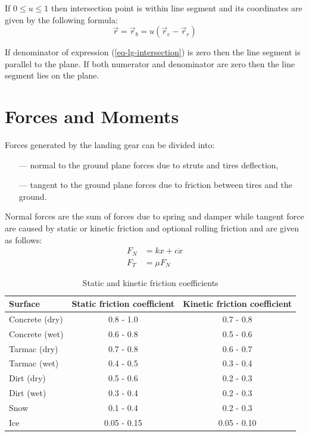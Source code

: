 If $0 \leq u \leq 1$ then intersection point is within line segment and its coordinates are given by the following formula:
\begin{equation}
  \vec r = {\vec r}_b = u \left( {\vec r}_e - {\vec r}_r \right)
\end{equation}

If denominator of expression (\ref{eq-lg-intersection}) is zero then the line segment is parallel to the plane. If both numerator and denominator are zero then the line segment lies on the plane.

\section{Forces and Moments}

Forces generated by the landing gear can be divided into:
\begin{itemize}
  \item[---] normal to the ground plane forces due to struts and tires deflection,
  \item[---] tangent to the ground plane forces due to friction between tires and the ground.
\end{itemize}

Normal forces are the sum of forces due to spring and damper while tangent force are caused by static or kinetic friction and optional rolling friction and are given as follows: \cite{ResnickHalliday2011}
\begin{align}
  F_N &= kx + c \dot x \\
  F_T &= \mu F_N
\end{align}

\begin{table}[h!]
  \begin{center}
    \begin{tabular}{ l | c | c }
      \toprule
      \textbf{Surface} & \textbf{Static friction coefficient} & \textbf{Kinetic friction coefficient} \\ \midrule
      Concrete (dry) &  0.8 - 1.0  &  0.7 - 0.8  \\
      Concrete (wet) &  0.6 - 0.8  &  0.5 - 0.6  \\
      Tarmac (dry)   &  0.7 - 0.8  &  0.6 - 0.7  \\
      Tarmac (wet)   &  0.4 - 0.5  &  0.3 - 0.4  \\
      Dirt (dry)     &  0.5 - 0.6  &  0.2 - 0.3  \\
      Dirt (wet)     &  0.3 - 0.4  &  0.2 - 0.3  \\
      Snow           &  0.1 - 0.4  &  0.2 - 0.3  \\
      Ice            & 0.05 - 0.15 & 0.05 - 0.10 \\
      \bottomrule
    \end{tabular}
    \caption{Static and kinetic friction coefficients \cite{Studzinski1980} }
  \end{center}
\end{table}

